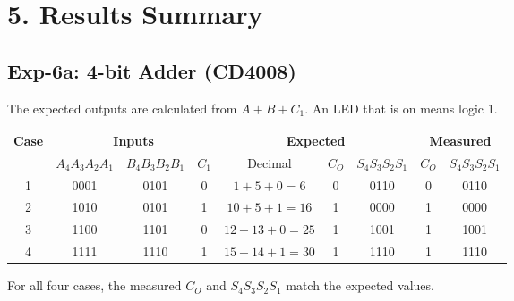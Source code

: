 \section*{5. Results Summary}

\subsection*{Exp-6a: 4-bit Adder (CD4008)}
The expected outputs are calculated from $A + B + C_1$. An LED that is on means logic 1.

\begin{table}[H]
\centering
\small
\begin{tabular}{c | c c c | c c c | c c}
\toprule
\multirow{2}{*}{\textbf{Case}} & \multicolumn{3}{c|}{\textbf{Inputs}} & \multicolumn{3}{c|}{\textbf{Expected}} & \multicolumn{2}{c}{\textbf{Measured}} \\
 & $A_4A_3A_2A_1$ & $B_4B_3B_2B_1$ & $C_1$ & Decimal & $C_O$ & $S_4S_3S_2S_1$ & $C_O$ & $S_4S_3S_2S_1$ \\
\midrule
1 & 0001 & 0101 & 0 & $1 + 5 + 0 = 6$   & 0 & 0110 & 0 & 0110 \\
2 & 1010 & 0101 & 1 & $10 + 5 + 1 = 16$ & 1 & 0000 & 1 & 0000 \\
3 & 1100 & 1101 & 0 & $12 + 13 + 0 = 25$ & 1 & 1001 & 1 & 1001 \\
4 & 1111 & 1110 & 1 & $15 + 14 + 1 = 30$ & 1 & 1110 & 1 & 1110 \\
\bottomrule
\end{tabular}
\label{tab:6a}
\end{table}
For all four cases, the measured $C_O$ and $S_4S_3S_2S_1$ match the expected values.

